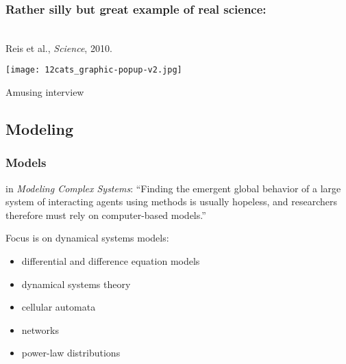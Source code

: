\begin{frame}
  \frametitle{Rather silly but great example of real science:}

  \\
  Reis et al., \textit{Science}, 2010.

  \medskip

  \texttt{[image: 12cats\_graphic-popup-v2.jpg]}

  Amusing interview 

\end{frame}


\subsection{Modeling}

\begin{frame}
  \frametitle{Models}

  \begin{block}{ in \textit{Modeling Complex Systems}:}
    ``Finding the emergent global behavior of a large
    system of interacting agents using methods is usually
    hopeless, and researchers therefore must rely on
    computer-based models.''
  \end{block}

  \begin{block}{Focus is on dynamical systems models:}
    \begin{itemize}
    \item<+-> 
      differential and difference equation models
    \item<+-> 
      dynamical systems theory
    \item<+-> 
      cellular automata
    \item<+-> 
      networks
    \item<+-> 
      power-law distributions
    \end{itemize}
  \end{block}

\end{frame}

